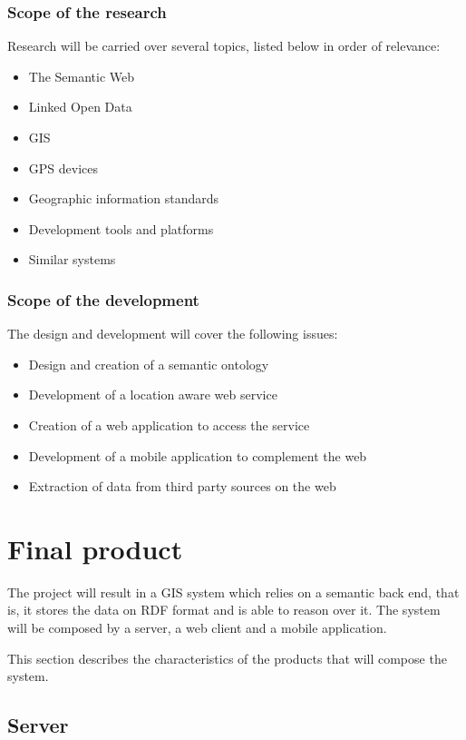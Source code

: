 \subsubsection*{Scope of the research}

Research will be carried over several topics, listed below in order of relevance:

\begin{itemize}
\item The Semantic Web
\item Linked Open Data
\item GIS
\item GPS devices
\item Geographic information standards
\item Development tools and platforms
\item Similar systems
\end{itemize}

\subsubsection*{Scope of the development}

The design and development will cover the following issues:

\begin{itemize}
\item Design and creation of a semantic ontology
\item Development of a location aware web service 
\item Creation of a web application to access the service
\item Development of a mobile application to complement the web
\item Extraction of data from third party sources on the web 
\end{itemize}

\section{Final product}

The project will result in a GIS system which relies on a semantic back end, that is, it stores the data on RDF format and is able to reason over it. The system will be composed by a server, a web client and a mobile application.

This section describes the characteristics of the products that will compose the system.

\subsection{Server}

